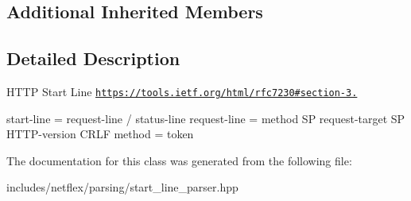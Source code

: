 \subsection*{Additional Inherited Members}


\subsection{Detailed Description}
H\+T\+TP Start Line \href{https://tools.ietf.org/html/rfc7230#section-3.1}{\tt https\+://tools.\+ietf.\+org/html/rfc7230\#section-\/3.}

start-\/line = request-\/line / status-\/line request-\/line = method SP request-\/target SP H\+T\+T\+P-\/version C\+R\+LF method = token 

The documentation for this class was generated from the following file\+:\begin{DoxyCompactItemize}
\item 
includes/netflex/parsing/start\+\_\+line\+\_\+parser.\+hpp\end{DoxyCompactItemize}
